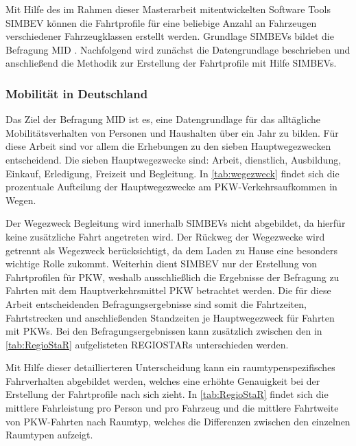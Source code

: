 Mit Hilfe des im Rahmen dieser Masterarbeit mitentwickelten Software Tools \gls{SIMBEV} können die Fahrtprofile für eine beliebige Anzahl an Fahrzeugen verschiedener Fahrzeugklassen erstellt werden.
Grundlage \glspl{SIMBEV} bildet die Befragung \gls{MID} \cite{ISGH2017}.
Nachfolgend wird zunächst die Datengrundlage beschrieben und anschließend die Methodik zur Erstellung der Fahrtprofile mit Hilfe \glspl{SIMBEV}.


\subsubsection{Mobilität in Deutschland}\label{chap:MID}

Das Ziel der Befragung \gls{MID} \cite{ISGH2017} ist es, eine Datengrundlage für das alltägliche Mobilitätsverhalten von Personen und Haushalten über ein Jahr zu bilden.
Für diese Arbeit sind vor allem die Erhebungen zu den sieben Hauptwegezwecken entscheidend.
Die sieben Hauptwegezwecke sind: Arbeit, dienstlich, Ausbildung, Einkauf, Erledigung, Freizeit und Begleitung.
In \autoref{tab:wegezweck} findet sich die prozentuale Aufteilung der Hauptwegezwecke am \gls{PKW}-Verkehrsaufkommen in Wegen.



Der Wegezweck \glqq Begleitung\grqq{} wird innerhalb \glspl{SIMBEV} nicht abgebildet, da hierfür keine zusätzliche Fahrt angetreten wird.
Der Rückweg der Wegezwecke wird getrennt als Wegezweck \nH berücksichtigt, da dem Laden zu Hause eine besonders wichtige Rolle zukommt.
Weiterhin dient \gls{SIMBEV} nur der Erstellung von Fahrtprofilen für \gls{PKW}, weshalb ausschließlich die Ergebnisse der Befragung zu Fahrten mit dem Hauptverkehrsmittel \gls{PKW} betrachtet werden.
Die für diese Arbeit entscheidenden Befragungsergebnisse sind somit die Fahrtzeiten, Fahrtstrecken und anschließenden Standzeiten je Hauptwegezweck für Fahrten mit \glspl{PKW}.
Bei den Befragungsergebnissen kann zusätzlich zwischen den in \autoref{tab:RegioStaR} aufgelisteten \glspl{REGIOSTAR} unterschieden werden.



Mit Hilfe dieser detaillierteren Unterscheidung kann ein raumtypenspezifisches Fahrverhalten abgebildet werden, welches eine erhöhte Genauigkeit bei der Erstellung der Fahrtprofile nach sich zieht.
In \autoref{tab:RegioStaR} findet sich die mittlere Fahrleistung pro Person und pro Fahrzeug und die mittlere Fahrtweite von \gls{PKW}-Fahrten nach Raumtyp, welches die Differenzen zwischen den einzelnen Raumtypen aufzeigt.

